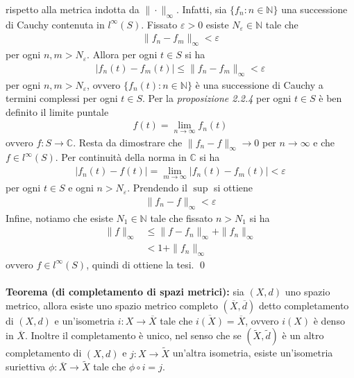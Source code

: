 \documentclass{article}
\numberwithin{equation}{subsection}
\begin{document}
rispetto alla metrica indotta da $\|\cdot\|_\infty$. Infatti, sia $\{f_n : n \in \mathbb{N}\}$ una successione di Cauchy contenuta in $l^\infty(S)$. Fissato $\varepsilon > 0$ esiste $N_\varepsilon \in \mathbb{N}$ tale che
\begin{align*}
    \|f_n - f_m\|_\infty < \varepsilon 
\end{align*}
per ogni $n, m > N_\varepsilon$. Allora per ogni $t \in S$ si ha
\begin{align*}
    |f_n(t) - f_m(t)| \leq \|f_n - f_m\|_\infty < \varepsilon 
\end{align*}
per ogni $n, m > N_\varepsilon$, ovvero $\{f_n(t) : n \in \mathbb{N}\}$ è una successione di Cauchy a termini complessi per ogni $t \in S$. Per la \textit{proposizione 2.2.4} per ogni $t \in S$ è ben definito il limite puntale
\begin{align*}
    f(t) = \lim_{n \rightarrow \infty} f_n(t)
\end{align*}
ovvero $f : S \longrightarrow \mathbb{C}$. Resta da dimostrare che $\|f_n - f\|_\infty \rightarrow 0$ per $n \rightarrow \infty$ e che $f \in l^\infty(S)$. Per continuità della norma in $\mathbb{C}$ si ha
 \begin{align*}
    |f_n(t) - f(t)| = \lim_{m \rightarrow \infty} |f_n(t) - f_m(t)| < \varepsilon
 \end{align*}
per ogni $t \in S$ e ogni $n > N_\varepsilon$. Prendendo il $\sup$ si ottiene
\begin{align*}
    \|f_n - f\|_\infty < \varepsilon
\end{align*}
Infine, notiamo che esiste $N_1 \in \mathbb{N}$ tale che fissato $n > N_1$ si ha
\begin{align*}
    \|f\|_\infty &\leq \|f - f_n\|_\infty + \|f_n\|_\infty  \\
    &< 1 + \|f_n\|_\infty 
\end{align*}
ovvero $f \in l^\infty(S)$, quindi di ottiene la tesi. \qed \\ \\
\textbf{Teorema (di completamento di spazi metrici):} sia $(X, d)$ uno spazio metrico, allora esiste uno spazio metrico completo $(\overline{X}, \overline{d})$ detto completamento di $(X, d)$ e un'isometria $i : X \longrightarrow \overline{X}$
tale che $\overline{i(X)} = \overline{X}$, ovvero $i(X)$ è denso in $\overline{X}$. Inoltre il completamento è unico, nel senso che se $(\widetilde{X}, \tilde{d})$ è un altro completamento di $(X, d)$ e $j : X \longrightarrow \widetilde{X}$
un'altra isometria, esiste un'isometria suriettiva $\phi : \overline{X} \longrightarrow \widetilde{X}$ tale che $\phi \circ i = j$. \\
\end{document}
